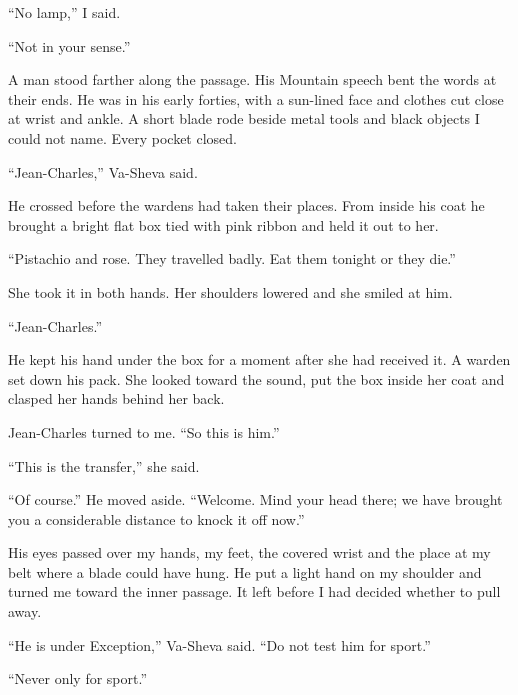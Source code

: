 ``No lamp,'' I said.\par

``Not in your sense.''\par

A man stood farther along the passage. His Mountain speech bent the words at their ends. He was in his early forties, with a sun-lined face and clothes cut close at wrist and ankle. A short blade rode beside metal tools and black objects I could not name. Every pocket closed.\par

``Jean-Charles,'' Va-Sheva said.\par

He crossed before the wardens had taken their places. From inside his coat he brought a bright flat box tied with pink ribbon and held it out to her.\par

``Pistachio and rose. They travelled badly. Eat them tonight or they die.''\par

She took it in both hands. Her shoulders lowered and she smiled at him.\par

``Jean-Charles.''\par

He kept his hand under the box for a moment after she had received it. A warden set down his pack. She looked toward the sound, put the box inside her coat and clasped her hands behind her back.\par

Jean-Charles turned to me. ``So this is him.''\par

``This is the transfer,'' she said.\par

``Of course.'' He moved aside. ``Welcome. Mind your head there; we have brought you a considerable distance to knock it off now.''\par

His eyes passed over my hands, my feet, the covered wrist and the place at my belt where a blade could have hung. He put a light hand on my shoulder and turned me toward the inner passage. It left before I had decided whether to pull away.\par

``He is under Exception,'' Va-Sheva said. ``Do not test him for sport.''\par

``Never only for sport.''\par

